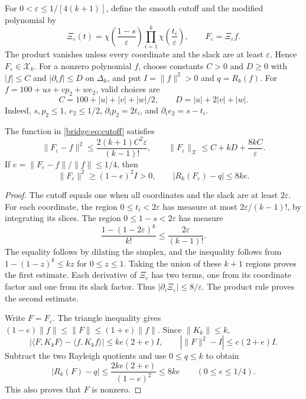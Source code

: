 \documentclass[11pt]{article}
\newcommand{\ip}[2]{\langle #1,#2\rangle}
\newcommand{\norm}[1]{\lVert #1\rVert}
\begin{document}
For $0<\varepsilon\leq1/[4(k+1)]$, define the smooth cutoff and the
modified polynomial by
\begin{equation}\label{bridge:eq:cutoff}
 \Xi_\varepsilon(t)
 =\chi\left(\frac{1-s}{\varepsilon}\right)
                  \prod_{i=1}^k\chi\left(\frac{t_i}{\varepsilon}\right),
 \qquad F_\varepsilon=\Xi_\varepsilon f.
\end{equation}
The product vanishes unless every coordinate and the slack are at least
$\varepsilon$.  Hence $F_\varepsilon\in\mathcal X_k$.
For a nonzero polynomial $f$, choose constants $C>0$ and $D\geq0$ with
$|f|\leq C$ and $|\partial_i f|\leq D$ on $\Delta_k$, and put
$I=\norm f^2>0$ and $q=R_k(f)$.
For $f=100+us+vp_2+we_2$, valid choices are
\begin{equation}\label{bridge:eq:CD}
 C=100+|u|+|v|+|w|/2,\qquad D=|u|+2|v|+|w|.
\end{equation}
Indeed, $s,p_2\leq1$, $e_2\leq1/2$,
$\partial_i p_2=2t_i$, and $\partial_i e_2=s-t_i$.

\begin{lemma}
The\label{bridge:lem:cutoff} function in \eqref{bridge:eq:cutoff} satisfies
\begin{equation}\label{bridge:eq:cutoff-error}
 \norm{F_\varepsilon-f}^2
 \leq\frac{2(k+1)C^2\varepsilon}{(k-1)!},\qquad
 \norm{F_\varepsilon}_{\mathcal X}
 \leq C+kD+\frac{8kC}{\varepsilon}.
\end{equation}
If $e=\norm{F_\varepsilon-f}/\norm f\leq1/4$, then
\begin{equation}\label{bridge:eq:rayleigh-error}
 \norm{F_\varepsilon}^2\geq(1-e)^2I>0,
 \qquad |R_k(F_\varepsilon)-q|\leq8ke.
\end{equation}
\end{lemma}

\begin{proof}
The cutoff equals one when all coordinates and the slack are at least
$2\varepsilon$.  For each coordinate, the region
$0\leq t_i<2\varepsilon$ has measure at most
$2\varepsilon/(k-1)!$, by integrating its slices.
The region $0\leq1-s<2\varepsilon$ has measure
\[
 \frac{1-(1-2\varepsilon)^k}{k!}
 \leq\frac{2\varepsilon}{(k-1)!}.
\]
The equality follows by dilating the simplex, and the inequality follows
from $1-(1-z)^k\leq kz$ for $0\leq z\leq1$.
Taking the union of these $k+1$ regions proves the first estimate.
Each derivative of $\Xi_\varepsilon$ has two terms, one from its
coordinate factor and one from its slack factor.
Thus $|\partial_i\Xi_\varepsilon|\leq8/\varepsilon$.
The product rule proves the second estimate.

Write $F=F_\varepsilon$.
The triangle inequality gives $(1-e)\norm f\leq\norm F\leq(1+e)\norm f$.
Since $\norm{K_k}\leq k$,
\[
 |\ip F{K_kF}-\ip f{K_kf}|\leq ke(2+e)I,
 \qquad |\norm F^2-I|\leq e(2+e)I.
\]
Subtract the two Rayleigh quotients and use $0\leq q\leq k$ to obtain
\[
 |R_k(F)-q|\leq\frac{2ke(2+e)}{(1-e)^2}\leq8ke
                         \qquad(0\leq e\leq1/4).
\]
This also proves that $F$ is nonzero.
\end{proof}
\end{document}

